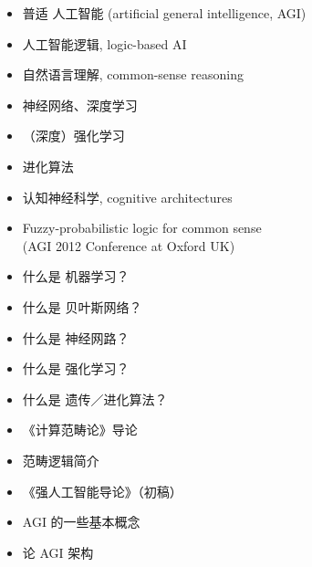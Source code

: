 \documentclass[10pt,a4paper]{altacv}
\begin{document}
\medskip


\begin{itemize}
	\item 普适 人工智能 (artificial general intelligence, AGI)
	\item 人工智能逻辑, logic-based AI
	\item 自然语言理解, common-sense reasoning
	\item 神经网络、深度学习
	\item （深度）强化学习
	\item 进化算法
	\item 认知神经科学, cognitive architectures
\end{itemize}

\medskip


\begin{itemize}
	\item Fuzzy-probabilistic logic for common sense \\
	(AGI 2012 Conference at Oxford UK)
\end{itemize}

%

\medskip


\begin{itemize}
	\item 什么是 机器学习？
	\item 什么是 贝叶斯网络？
	\item 什么是 神经网路？
	\item 什么是 强化学习？
	\item 什么是 遗传／进化算法？
	\item 《计算范畴论》导论
	\item 范畴逻辑简介
	\item 《强人工智能导论》（初稿）
	\item AGI 的一些基本概念
	\item 论 AGI 架构
\end{itemize}
\end{document}
